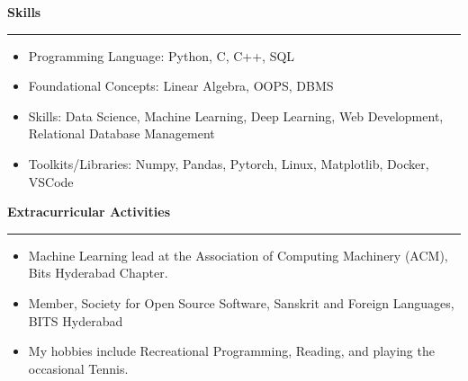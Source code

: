 \documentclass[a4paper,12pt]{report}
\begin{document}
 \par
\vspace{9pt}


\noindent 
\textbf{Skills} \par
\vspace{2pt}
\hrule
\vspace{6pt}
\noindent 
\begin{itemize}[noitemsep,topsep=0pt]
\item {\fontsize{12pt}{12pt}\selectfont Programming Language:}  Python, C, C++, SQL \par
\noindent 
\item {\fontsize{12pt}{12pt}\selectfont Foundational Concepts:} Linear Algebra, OOPS, DBMS \par
\noindent 
\item {\fontsize{12pt}{12pt}\selectfont Skills:} Data Science, Machine Learning, Deep Learning, Web Development, Relational Database Management \par
\noindent 
\item {\fontsize{12pt}{12pt}\selectfont Toolkits/Libraries:} Numpy, Pandas, Pytorch, Linux, Matplotlib, Docker, VSCode \par
\end{itemize}

\noindent
\textbf{Extracurricular Activities} \par
\vspace{2pt}
\hrule
\vspace{6pt}
\begin{itemize}[left=0pt, noitemsep, topsep=0pt]
    \item {\fontsize{12pt}{12pt} Machine Learning lead at the Association of Computing Machinery (ACM), Bits Hyderabad Chapter.}
    \item {\fontsize{12pt}{12pt}\selectfont Member, Society for Open Source Software, Sanskrit and Foreign Languages, BITS Hyderabad} \par
    \item {\fontsize{12pt}{12pt}\selectfont My hobbies include Recreational Programming, Reading, and playing the occasional Tennis.} \par
\end{itemize}
\end{document}
